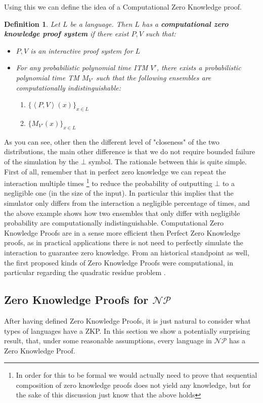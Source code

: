 \documentclass{article}
\newtheorem{definition}{Definition}
\begin{document}
Using this we can define the idea of a Computational Zero Knowledge proof.
\begin{definition}
Let $L$ be a language. Then $L$ has a \textbf{computational zero knowledge proof system} if there exist $P, V$ such that:
\begin{itemize}
    \item $P, V$ is an interactive proof system for $L$
    \item For any probabilistic polynomial time ITM $V'$, there exists a probabilistic polynomial time TM $M_{V'}$ such that the following ensembles are computationally indistinguishable:
    \begin{enumerate}
        \item $\{ \left<P, V \right>(x) \}_{x \in L}$
        \item $\{ M_{V'}(x) \}_{x \in L}$
    \end{enumerate}
        
\end{itemize}
\end{definition}
As you can see, other then the different level of "closeness" of the two distributions, the main other difference is that we do not require bounded failure of the simulation by the $\bot$ symbol. The rationale between this is quite simple. First of all, remember that in perfect zero knowledge we can repeat the interaction multiple times \footnote{In order for this to be formal we would actually need to prove that sequential composition of zero knowledge proofs does not yield any knowledge, but for the sake of this discussion just know that the above holds} to reduce the probability of outputting $\bot$ to a negligible one (in the size of the input). In particular this implies that the simulator only differs from the interaction a negligible percentage of times, and the above example shows how two ensembles that only differ with negligible probability are computationally indistinguishable. Computational Zero Knowledge Proofs are in a sense more efficient then Perfect Zero Knowledge proofs, as in practical applications there is not need to perfectly simulate the interaction to guarantee zero knowledge. From an historical standpoint as well, the first proposed kinds of Zero Knowledge Proofs were computational, in particular regarding the quadratic residue problem \cite{goldwasserKnowledgeComplexityInteractive1989}. 



\subsection{Zero Knowledge Proofs for $\mathcal{NP}$}
After having defined Zero Knowledge Proofs, it is just natural to consider what types of languages have
a ZKP. In this section we show a potentially surprising result, that, under some reasonable assumptions, every language in $\mathcal{NP}$ has 
a Zero Knowledge Proof.
\end{document}

